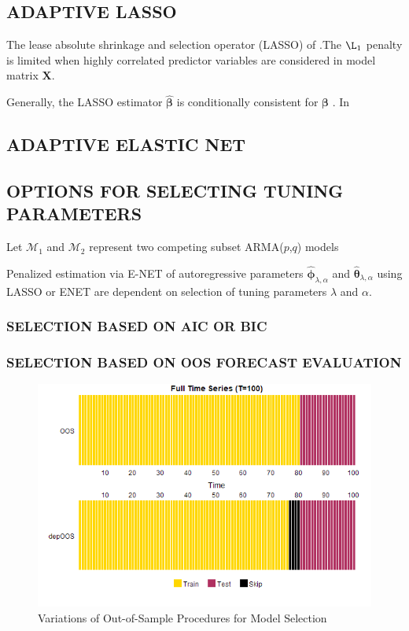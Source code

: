 \subsection{ADAPTIVE LASSO}
The lease absolute shrinkage and selection operator (LASSO) of \cite{Tibshirani1996}.The $\L_1$ penalty is limited when highly correlated predictor variables are considered in model matrix $\bm{X}$.

Generally, the LASSO estimator $\hat{\bm{\beta}}$ is conditionally consistent for $\bm{\beta}$ 
\cite{Zhao2006}.
In \cite{Zou2006}

\subsection{ADAPTIVE ELASTIC NET}


\subsection{OPTIONS FOR SELECTING TUNING PARAMETERS}
Let $\mathcal{M}_1$ and $\mathcal{M}_2$ represent two competing subset ARMA($p$,$q$) models

Penalized estimation via E-NET of autoregressive parameters $\hat{\bm{\phi}}_{\lambda,\alpha}$ and $\hat{\bm{\theta}}_{\lambda,\alpha}$ using LASSO or ENET are dependent on selection of tuning parameters $\lambda$ and  $\alpha$.

\subsubsection{SELECTION BASED ON AIC OR BIC}

\subsubsection{SELECTION BASED ON OOS FORECAST EVALUATION}

\begin{figure}[htbp!]
	\caption{Variations of Out-of-Sample Procedures for Model Selection}
	\label{fig:oosplots}
	\includegraphics[scale=0.7]{oosplots}
\end{figure}

